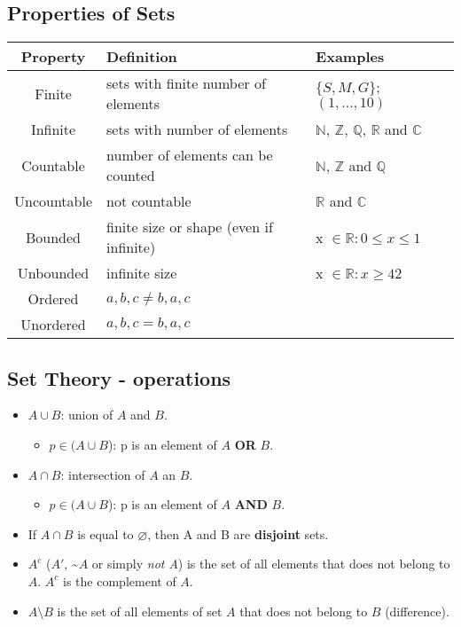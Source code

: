 \documentclass[11pt]{article}
\let\emptyset\varnothing
\begin{document}
\subsection*{Properties of Sets}

\begin{tabular}{cll}
	Property & Definition & Examples \\
	\hline
	Finite & sets with finite number of elements & $\{S, M, G\}$; $(1, ..., 10)$\\ 
	Infinite & sets with  number of elements & $\mathbb{N}$, $\mathbb{Z}$, $\mathbb{Q}$, $\mathbb{R}$ and $\mathbb{C}$\\
	Countable & number of elements can be counted & $\mathbb{N}$, $\mathbb{Z}$ and $\mathbb{Q}$\\
	Uncountable & not countable & $\mathbb{R}$ and $\mathbb{C}$ \\
	Bounded & finite size or shape (even if infinite)  & x $\in \mathbb{R}: 0 \leq x \leq 1$\\
	Unbounded & infinite size & x $\in \mathbb{R}: x \geq 42$\\
	Ordered & ${a, b, c} \neq {b, a, c}$  & \\
	Unordered & ${a, b, c} = {b, a, c}$  & \\
\end{tabular}


\subsection*{Set Theory - operations}

	\begin{itemize}
		\item $A \cup B$: union of $A$ and $B$.
		\begin{itemize}
			\item $p \in (A \cup B$): p is an element of $A$ \textbf{OR} $B$.
		\end{itemize}
		\item $A \cap B$: intersection of $A$ an $B$.
		\begin{itemize}
			\item $p \in (A \cup B$): p is an element of $A$ \textbf{AND} $B$.
		\end{itemize}
		\item If $A \cap B$ is equal to $\emptyset$, then A and B are \textbf{disjoint} sets.
		\item $A^c$ ($A'$, \textasciitilde$A$ or simply \emph{not A}) is the set of all elements that does not belong to $A$. $A^c$ is the complement of $A$. 
		\item $A \setminus B$ is the set of all elements of set $A$ that does not belong to $B$ (difference). 

	\end{itemize}
\end{document}
